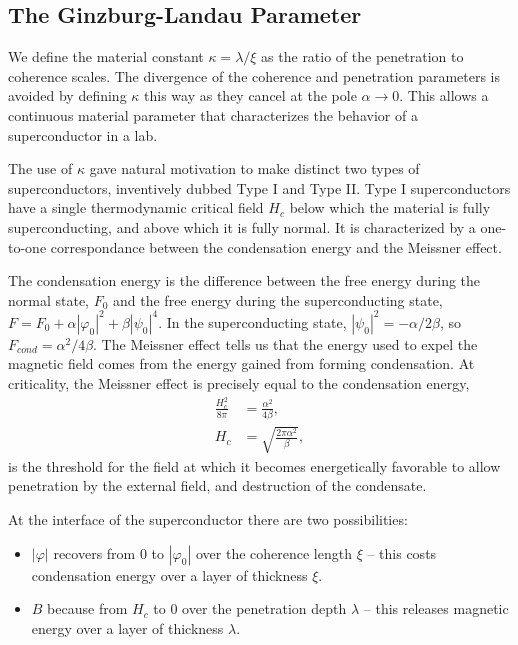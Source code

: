 \documentclass[10pt,twoside]{report}
\numberwithin{equation}{chapter}
\begin{document}
\subsection{The Ginzburg-Landau Parameter}

We define the material constant $\kappa = \lambda/\xi$ as the ratio of the penetration to coherence scales.  The divergence of the coherence and penetration parameters is avoided by defining $\kappa$ this way as they cancel at the pole $\alpha\to 0$.  This allows a continuous material parameter that characterizes the behavior of a superconductor in a lab.

The use of $\kappa$ gave natural motivation to make distinct two types of superconductors, inventively dubbed Type I and Type II.  Type I superconductors have  a single thermodynamic critical field $H_{c}$ below which the material is fully superconducting, and above which it is fully normal.  It is characterized by a one-to-one correspondance between the condensation energy and the Meissner effect. 

The condensation energy is the difference between the free energy during the normal state, $F_{0}$ and the free energy during the superconducting state, $F = F_{0} + \alpha|\varphi_{0}|^{2} + \beta|\psi_{0}|^{4}$.  In the superconducting state, $|\psi_{0}|^{2}=-\alpha/2\beta$, so $F_{cond} = \alpha^{2}/4\beta$.  The Meissner effect tells us that the energy used to expel the magnetic field comes from the energy gained from forming condensation.  At criticality, the Meissner effect is precisely equal to the condensation energy,
\begin{align}
  \frac{H_{c}^{2}}{8\pi} &= \frac{\alpha^{2}}{4\beta}, \nonumber\\
  H_{c} &= \sqrt{\frac{2\pi\alpha^{2}}{\beta}},
\end{align}
is the threshold for the field at which it becomes energetically favorable to allow penetration by the external field, and destruction of the condensate.

At the interface of the superconductor there are two possibilities:
\begin{itemize}

  \item $|\varphi|$ recovers from $0$ to $|\varphi_{0}|$ over the coherence length $\xi$ -- this costs condensation energy over a layer of thickness $\xi$.
  \item $B$ because from $H_{c}$ to $0$ over the penetration depth $\lambda$ -- this releases magnetic energy over a layer of thickness $\lambda$.

\end{itemize}
\end{document}
